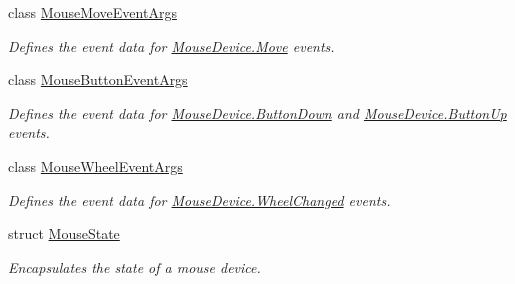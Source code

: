 \begin{DoxyCompactItemize}
class \hyperlink{class_open_t_k_1_1_input_1_1_mouse_move_event_args}{Mouse\-Move\-Event\-Args}
\begin{DoxyCompactList}\small\item\em Defines the event data for \hyperlink{class_open_t_k_1_1_input_1_1_mouse_device_ae98bb40aa03f634ecb53a73971dd9097}{Mouse\-Device.\-Move} events. \end{DoxyCompactList}\item 
class \hyperlink{class_open_t_k_1_1_input_1_1_mouse_button_event_args}{Mouse\-Button\-Event\-Args}
\begin{DoxyCompactList}\small\item\em Defines the event data for \hyperlink{class_open_t_k_1_1_input_1_1_mouse_device_a6d161629ddeb7adefb6f8332824778bd}{Mouse\-Device.\-Button\-Down} and \hyperlink{class_open_t_k_1_1_input_1_1_mouse_device_a244f6f68b32bfe3f745e2b8087e970e8}{Mouse\-Device.\-Button\-Up} events. \end{DoxyCompactList}\item 
class \hyperlink{class_open_t_k_1_1_input_1_1_mouse_wheel_event_args}{Mouse\-Wheel\-Event\-Args}
\begin{DoxyCompactList}\small\item\em Defines the event data for \hyperlink{class_open_t_k_1_1_input_1_1_mouse_device_a4bee8a35ae92c6d4f74868934a5c2475}{Mouse\-Device.\-Wheel\-Changed} events. \end{DoxyCompactList}\item 
struct \hyperlink{struct_open_t_k_1_1_input_1_1_mouse_state}{Mouse\-State}
\begin{DoxyCompactList}\small\item\em Encapsulates the state of a mouse device. \end{DoxyCompactList}\end{DoxyCompactItemize}
